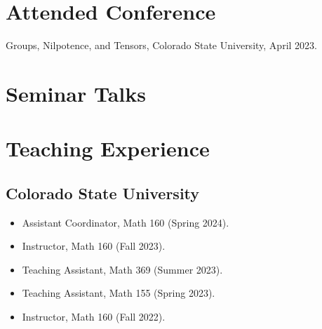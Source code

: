 \documentclass{cv_style}
\begin{document}
	\section{Attended Conference}
		\begin{etaremune}
			\item Groups, Nilpotence, and Tensors, Colorado State University, April 2023.
		\end{etaremune}

		\section{Seminar Talks}
		\begin{etaremune}
			\item {}
			\item {}
		\end{etaremune}
		
	\section{Teaching Experience}
		\subsection{Colorado State University}
		\begin{itemize}
			\item Assistant Coordinator, Math 160 (Spring 2024).
			\item Instructor, Math 160 (Fall 2023).
			\item Teaching Assistant, Math 369 (Summer 2023).
			\item Teaching Assistant, Math 155 (Spring 2023).
			\item Instructor, Math 160 (Fall 2022).
		\end{itemize}
		
	
	
\end{document}
